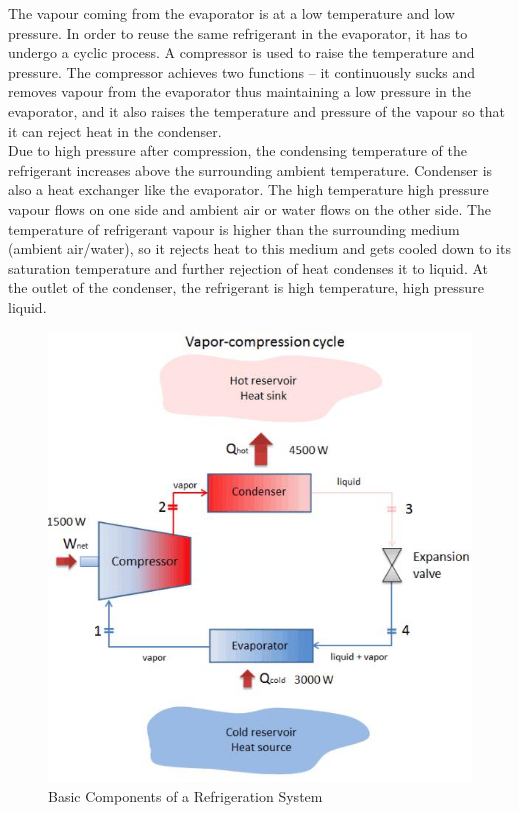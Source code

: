 \documentclass[11pt]{article}
\begin{document}
The vapour coming from the evaporator is at a low temperature and low pressure. In order to reuse the same refrigerant in the evaporator, it has to undergo a cyclic process. A compressor is used to raise the temperature and pressure. The compressor achieves two functions – it continuously sucks and removes vapour from the evaporator thus maintaining a low pressure in the evaporator, and it also raises the temperature and pressure of the vapour so that it can reject heat in the condenser.\\


Due to high pressure after compression, the condensing temperature of the refrigerant increases above the surrounding ambient temperature. Condenser is also a heat exchanger like the evaporator. The high temperature high pressure vapour flows on one side and ambient air or water flows on the other side. The temperature of refrigerant vapour is higher than the surrounding medium (ambient air/water), so it rejects heat to this medium and gets cooled down to its saturation temperature and further rejection of heat condenses it to liquid. At the outlet of the condenser, the refrigerant is high temperature, high pressure liquid.\\

\begin{figure}[H]
	\centering
	\includegraphics[scale=0.6]{Refrigeration system.jpg}
	\caption{Basic Components of a Refrigeration System\cite{VP cycle}}
	\label{fig:Refrigeration System}
\end{figure}
\end{document}
